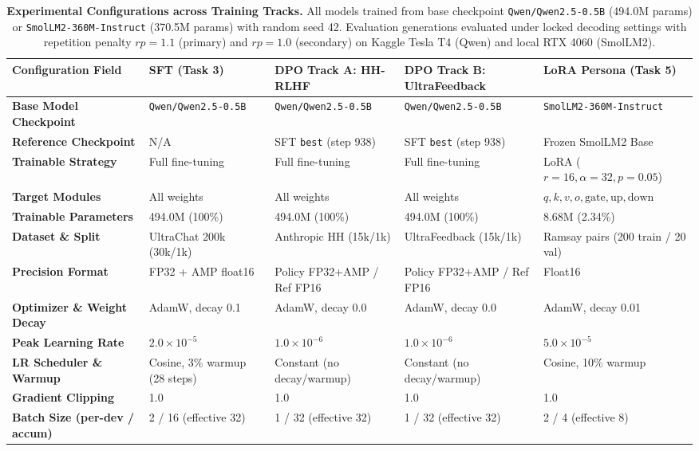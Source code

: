 \begin{table}[t]
\centering
\small
\caption{\textbf{Experimental Configurations across Training Tracks.} All models trained from base checkpoint \texttt{Qwen/Qwen2.5-0.5B} (494.0M params) or \texttt{SmolLM2-360M-Instruct} (370.5M params) with random seed 42. Evaluation generations evaluated under locked decoding settings with repetition penalty $rp=1.1$ (primary) and $rp=1.0$ (secondary) on Kaggle Tesla T4 (Qwen) and local RTX 4060 (SmolLM2).}
\label{tab:config}
\begin{tabularx}{\textwidth}{lXXXX}
\toprule
\textbf{Configuration Field} & \textbf{SFT (Task 3)} & \textbf{DPO Track A: HH-RLHF} & \textbf{DPO Track B: UltraFeedback} & \textbf{LoRA Persona (Task 5)} \\
\midrule
\textbf{Base Model Checkpoint} & \texttt{Qwen/Qwen2.5-0.5B} & \texttt{Qwen/Qwen2.5-0.5B} & \texttt{Qwen/Qwen2.5-0.5B} & \texttt{SmolLM2-360M-Instruct} \\
\textbf{Reference Checkpoint} & N/A & SFT \texttt{best} (step 938) & SFT \texttt{best} (step 938) & Frozen SmolLM2 Base \\
\textbf{Trainable Strategy} & Full fine-tuning & Full fine-tuning & Full fine-tuning & LoRA ($r=16, \alpha=32, p=0.05$) \\
\textbf{Target Modules} & All weights & All weights & All weights & $q, k, v, o, \text{gate}, \text{up}, \text{down}$ \\
\textbf{Trainable Parameters} & 494.0M (100\%) & 494.0M (100\%) & 494.0M (100\%) & 8.68M (2.34\%) \\
\textbf{Dataset \& Split} & UltraChat 200k (30k/1k) & Anthropic HH (15k/1k) & UltraFeedback (15k/1k) & Ramsay pairs (200 train / 20 val) \\
\textbf{Precision Format} & FP32 + AMP float16 & Policy FP32+AMP / Ref FP16 & Policy FP32+AMP / Ref FP16 & Float16 \\
\textbf{Optimizer \& Weight Decay} & AdamW, decay 0.1 & AdamW, decay 0.0 & AdamW, decay 0.0 & AdamW, decay 0.01 \\
\textbf{Peak Learning Rate} & $2.0 \times 10^{-5}$ & $1.0 \times 10^{-6}$ & $1.0 \times 10^{-6}$ & $5.0 \times 10^{-5}$ \\
\textbf{LR Scheduler \& Warmup} & Cosine, 3\% warmup (28 steps) & Constant (no decay/warmup) & Constant (no decay/warmup) & Cosine, 10\% warmup \\
\textbf{Gradient Clipping} & 1.0 & 1.0 & 1.0 & 1.0 \\
\textbf{Batch Size (per-dev / accum)} & 2 / 16 (effective 32) & 1 / 32 (effective 32) & 1 / 32 (effective 32) & 2 / 4 (effective 8) \\

\end{tabularx}
\end{table}
